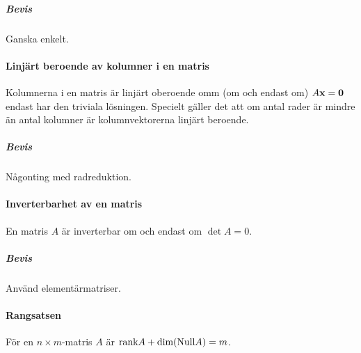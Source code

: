 \subparagraph{Bevis}
Ganska enkelt.

\paragraph{Linjärt beroende av kolumner i en matris}
Kolumnerna i en matris är linjärt oberoende omm (om och endast om) $A\vect{x} = \vect{0}$ endast har den triviala lösningen. Specielt gäller det att om antal rader är mindre än antal kolumner är kolumnvektorerna linjärt beroende.

\subparagraph{Bevis}
Någonting med radreduktion.

\paragraph{Inverterbarhet av en matris}
En matris $A$ är inverterbar om och endast om $\det A = 0$.

\subparagraph{Bevis}
Använd elementärmatriser.

\paragraph{Rangsatsen}
För en $n\times m$-matris $A$ är $\text{rank} A + \text{dim}(\text{Null} A) = m$.